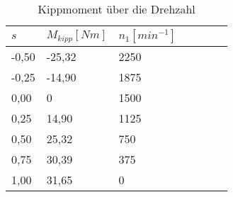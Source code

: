 \begin{table}[htbp]
    \centering
    \begin{tabularx}{\columnwidth}{XXXXXXX}
        \toprule
        $s$   & $M_{kipp}[Nm]$ & $n_1[min^{-1}]$ \\
        \midrule
        -0,50 & -25,32  & 2250            \\
        -0,25 & -14,90  & 1875            \\
        0,00  & 0       & 1500            \\
        0,25  & 14,90   & 1125            \\
        0,50  & 25,32   & 750             \\
        0,75  & 30,39   & 375             \\
        1,00  & 31,65   & 0               \\
        \bottomrule
    \end{tabularx}
    \caption{Kippmoment über die Drehzahl}
    \label{tab:M_kipp-mit-laeufervorwiderstand}
\end{table}
